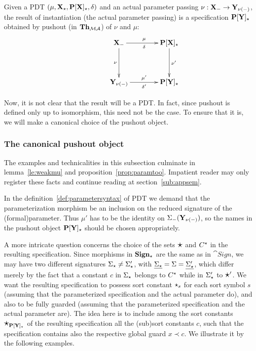 \begin{definition}\label{def:actparPush}
Given a PDT $(\mu,{\bf X_\star},{\bf P[X]_\star},\delta)$ 
and an actual parameter passing $\nu:{\bf X_-}
\to 
{\bf Y_{\nu(-)}}$, the result of instantiation (the actual parameter passing)
 is a specification ${\bf P[Y]_\star}$ obtained by pushout (in ${\bf Th}_{{\mathcal{MA}}}$) of
$\nu$ and $\mu$:
\[ \xymatrix@R=0.6cm@C=0.6cm{
	&& \thr{X_\weak} \ar[rr]^{\mu}_\delta \ar[dd]_{\nu}
			&& \thr{P[X]_\cons} \ar[dd]^{\nu'}	\\
	\\
			&& \thr{Y_{\nu(\weak)}} \ar[rr]^{\mu'}_{\delta'}
			&& \thr{P[Y]_\cons}
								}
\]
\end{definition}
%
Now, it is not clear that the result will be a PDT. In fact, since pushout is
defined only up to isomorphism, this need not be the case. To ensure that it
is, we will make a canonical choice of the pushout object. 

\subsubsection{The canonical pushout object}\label{sub:canpush}
The examples and technicalities in this subsection culminate in
lemma~\ref{le:weakmu} and proposition~\ref{prop:paramtoo}. Impatient reader
may only register these facts and continue reading at section~\ref{sub:appsem}.

In the definition~\ref{def:parametersyntax} of PDT
we demand that the parameterization
morphism  be an inclusion on the reduced signature of the
(formal)parameter. Thus $\mu'$ has to be the identity on
$\Sigma_-({\bf Y_{\nu(-)}})$, so the names in the pushout object
${\bf P[Y]_\star}$ should be chosen appropriately.

A more intricate question concerns the choice of the sets $\mbox{\Large{$\star$}}$ and
$C^\star$ in the resulting specification. Since morphisms in
${\bf Sign_\star}$ are the same as in $\cat{Sign}$, we may have two different
signatures $\Sigma_\star\not=\Sigma'_\star$, with
$\underline{\Sigma_\star}=\Sigma=\underline{\Sigma'_\star}$, which differ merely by
the fact that a constant $c$ in $\Sigma_\star$ belongs to $C^\star$ while in
$\Sigma'_\star$ to $\mbox{\Large{$\star$}}'$. 
We want the resulting
specification to possess sort constant $\star_s$ for each sort symbol $s$
(assuming that the parameterized specification and the actual parameter do),
and also to be fully guarded (assuming that the parameterized
specification and the actual parameter are). The idea here is to include
among the sort constants $\mbox{\Large{$\star$}}_{{\bf P[Y]_{\star}}}$ of the resulting specification all the
(sub)sort constants $c$, such that the specification contains also the
respective global guard $x\prec c$. 
We illustrate it by the following examples.

